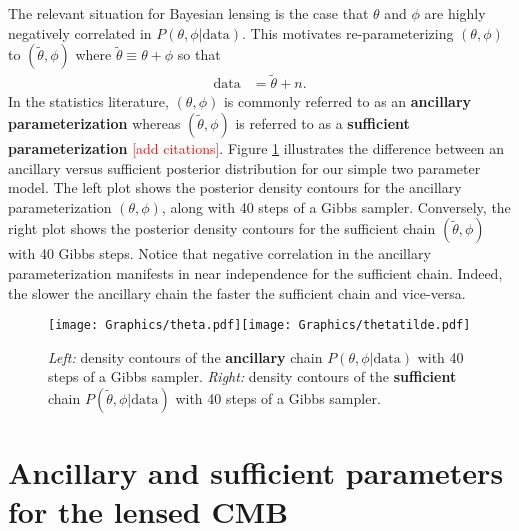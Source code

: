\documentclass[11pt]{article}
\begin{document}
The relevant situation for Bayesian lensing is the case that $\theta$ and $\phi$ are highly negatively correlated in $P(\theta, \phi|\text{data})$.  This motivates re-parameterizing $(\theta,\phi)$ to $(\widetilde \theta, \phi)$ where $\widetilde \theta \equiv \theta + \phi$ so that
\begin{align*}
\text{data} &= \widetilde \theta + n.
\end{align*}
In the statistics literature,  $(\theta, \phi)$ is commonly referred to as an {\bf ancillary parameterization} whereas $(\widetilde \theta, \phi)$ is referred to as a {\bf sufficient parameterization} \textcolor{red}{[add citations]}. Figure  \ref{fastslowGibbs} illustrates the difference between an ancillary versus sufficient posterior distribution for our simple two parameter model. The left plot shows the posterior density contours for the ancillary parameterization $(\theta, \phi)$, along with 40 steps of a Gibbs sampler.  Conversely, the right plot shows the posterior density contours for the sufficient chain $(\widetilde \theta, \phi)$ with 40 Gibbs steps. Notice that negative correlation  in the ancillary parameterization manifests in near independence for the sufficient chain.  Indeed, the slower the ancillary chain the faster the sufficient chain and vice-versa. 
\begin{figure}[H]
\label{fastslowGibbs}
\texttt{[image: Graphics/theta.pdf]}\texttt{[image: Graphics/thetatilde.pdf]}
\caption{{\em Left:} density contours of the {\bf ancillary} chain $P(\theta, \phi|\text{data})$ with 40 steps of a Gibbs sampler. {\em Right:} density contours of the {\bf sufficient}  chain $P(\widetilde \theta, \phi|\text{data})$ with 40 steps of a Gibbs sampler.}
\end{figure}
 





	
%
%
\section{Ancillary and sufficient parameters for the lensed CMB}
\end{document}

